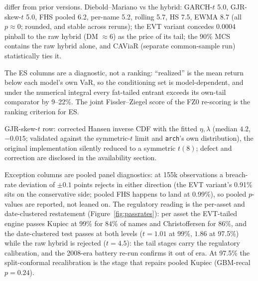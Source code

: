\documentclass[11pt]{article}
\theoremstyle{remark}
\begin{document}
\begin{table}[t]
\begin{threeparttable}
\begin{tablenotes}
differ from prior versions.
Diebold--Mariano vs the hybrid: GARCH-$t$ 5.0, GJR-skew-$t$ 5.0,
FHS pooled 6.2, per-name 5.2, rolling 5.7, HS 7.5, EWMA 8.7 (all
$p\approx0$; rounded, and stable across reruns); the EVT variant
concedes 0.0004 pinball to the raw hybrid (DM ${\approx}6$) as the
price of its tail; the 90\% MCS contains the
raw hybrid alone, and CAViaR (separate common-sample run)
statistically ties it.
\item The ES columns are a diagnostic, not a ranking:
``realized'' is the mean return below each model's own VaR, so
the conditioning set is model-dependent, and under the numerical integral
every fat-tailed entrant exceeds its own-tail comparator by 9--22\%.
The joint Fissler--Ziegel score of the FZ0 re-scoring is the ranking
criterion for ES.
\item GJR-skew-$t$ row: corrected Hansen inverse CDF with the fitted
$\eta,\lambda$ (median $4.2$, $-0.015$; validated against the
symmetric-$t$ limit and \texttt{arch}'s own distribution), the original implementation silently reduced to a symmetric $t(8)$; defect
and correction are disclosed in the availability section.
\item Exception columns are pooled panel diagnostics: at 155k
observations a breach-rate deviation of $\pm0.1$ points rejects in
either direction (the EVT variant's 0.91\% sits on the conservative
side; pooled FHS happens to land at 0.99\%), so pooled $p$-values are
reported, not leaned on. The regulatory reading is the per-asset and
date-clustered restatement (Figure~\ref{fig:passrates}): per asset the
EVT-tailed engine passes Kupiec at 99\% for $84\%$ of names and
Christoffersen for $86\%$, and the date-clustered test passes at both
levels ($t=1.01$ at 99\%, $1.86$ at 97.5\%) while the raw hybrid is rejected ($t=4.5$): the tail stages carry the regulatory
calibration, and the 2008-era battery re-run confirms it out of era.
At 97.5\% the split-conformal recalibration is the stage that repairs
pooled Kupiec (GBM-recal $p=0.24$).
\end{tablenotes}
\end{threeparttable}
\end{table}
\end{document}

